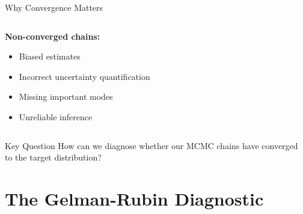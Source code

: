 \documentclass[aspectratio=169]{beamer}
\begin{document}
\begin{frame}{Why Convergence Matters}
    \begin{columns}
        \begin{column}{0.5\textwidth}
            \textbf{Non-converged chains:}
            \begin{itemize}
                \item Biased estimates
                \item Incorrect uncertainty quantification
                \item Missing important modes
                \item Unreliable inference
            \end{itemize}
        \end{column}
        \begin{column}{0.5\textwidth}
            \begin{center}
            \end{center}
        \end{column}
    \end{columns}
    
    \vspace{0.5cm}
    \begin{block}{Key Question}
        How can we diagnose whether our MCMC chains have converged to the target distribution?
    \end{block}
\end{frame}

\section{The Gelman-Rubin Diagnostic}
\end{document}
